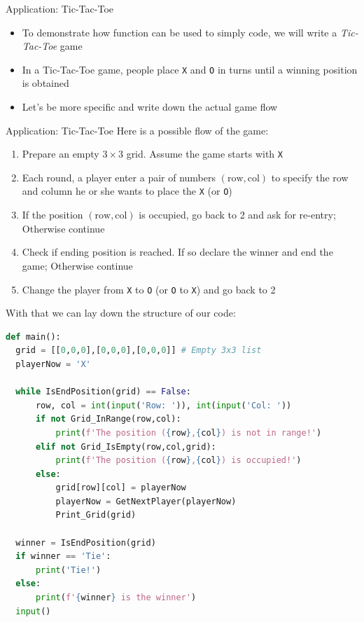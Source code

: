 \documentclass[10pt,xcolor={table,dvipsnames},t]{beamer}
\begin{document}
\begin{frame}{Application: Tic-Tac-Toe}
  \begin{itemize}
    \item To demonstrate how function can be used to simply code, we will write a \textit{Tic-Tac-Toe} game
    \item In a Tic-Tac-Toe game, people place \texttt{X} and \texttt{O} in turns until a winning position is obtained
    \item Let's be more specific and write down the actual game flow
  \end{itemize}
\end{frame}

\begin{frame}{Application: Tic-Tac-Toe}
  Here is a possible flow of the game:
  \begin{enumerate}
    \item Prepare an empty $3\times 3$ grid. Assume the game starts with \texttt{X}
    \item Each round, a player enter a pair of numbers $(\text{row},\text{col})$ to specify the row and column he or she wants to place the \texttt{X} (or \texttt{O})
    \item If the position $(\text{row},\text{col})$ is occupied, go back to 2 and ask for re-entry; Otherwise continue
    \item Check if ending position is reached. If so declare the winner and end the game; Otherwise continue 
    \item Change the player from \texttt{X} to \texttt{O} (or \texttt{O} to \texttt{X}) and go back to 2
  \end{enumerate}
\end{frame}

\begin{frame}[fragile]
  With that we can lay down the structure of our code:
\begin{lstlisting}[language=python]
def main():
  grid = [[0,0,0],[0,0,0],[0,0,0]] # Empty 3x3 list
  playerNow = 'X'

  while IsEndPosition(grid) == False:
      row, col = int(input('Row: ')), int(input('Col: '))
      if not Grid_InRange(row,col):
          print(f'The position ({row},{col}) is not in range!')
      elif not Grid_IsEmpty(row,col,grid):
          print(f'The position ({row},{col}) is occupied!')
      else:
          grid[row][col] = playerNow
          playerNow = GetNextPlayer(playerNow)
          Print_Grid(grid)

  winner = IsEndPosition(grid)
  if winner == 'Tie':
      print('Tie!')
  else:
      print(f'{winner} is the winner')
  input()
\end{lstlisting}
\end{frame}
\end{document}
